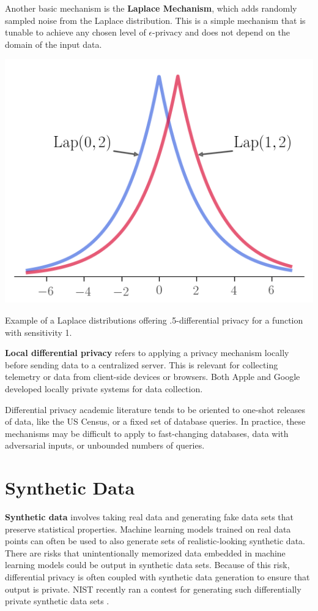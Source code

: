 \documentclass[nobib]{tufte-handout}
\begin{document}
Another basic mechanism is the \textbf{Laplace Mechanism}, which adds randomly
sampled noise from the Laplace distribution. This is a simple mechanism that is
tunable to achieve any chosen level of $\epsilon$-privacy and does not depend on
the domain of the input data.

\begin{marginfigure} \includegraphics[width=\linewidth]{laplace}
\caption{Example of a Laplace distributions offering .5-differential privacy for
a function with sensitivity 1.} \label{fig:laplace} \end{marginfigure}

\textbf{Local differential privacy} refers to applying a privacy mechanism
locally before sending data to a centralized server. This is relevant for
collecting telemetry or data from client-side devices or browsers. Both
Apple \cite{apple-local-differential-privacy} and Google
\cite{erlingsson2014rappor} developed locally private systems for data
collection.

Differential privacy academic literature tends to be oriented to one-shot
releases of data, like the US Census, or a fixed set of database queries. In
practice, these mechanisms may be difficult to apply to fast-changing databases,
data with adversarial inputs, or unbounded numbers of queries.

\section{Synthetic Data}

\textbf{Synthetic data} involves taking real data and generating fake data sets
that preserve statistical properties. Machine learning models trained on real
data points can often be used to also generate sets of realistic-looking
synthetic data. There are risks that unintentionally memorized data
\cite{DBLP:journals/corr/abs-1802-08232} embedded in machine learning models
could be output in synthetic data sets. Because of this risk, differential
privacy is often coupled with synthetic data generation to ensure that output is
private. NIST recently ran a contest for generating such differentially private
synthetic data sets \cite{nist-synthetic-data}.
\end{document}
